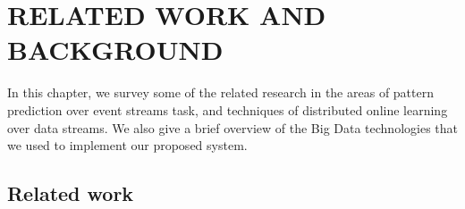
\chapter{RELATED WORK AND BACKGROUND}
\label{chap:realred_work}


\par In this chapter, we survey some of the related research in the areas of pattern prediction over event streams task, and techniques of distributed online learning over data streams. We also give a brief overview of the Big Data technologies that we used to implement our proposed system.  
\section{Related work}





